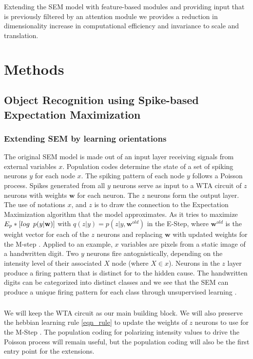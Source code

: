 \documentclass{report}
\begin{document}
Extending the SEM model with feature-based modules and providing input that is previously filtered by an attention module we provides a reduction in dimensionality increase in computational efficiency and invariance to scale and translation.

\chapter{Methods}
\section{Object Recognition using Spike-based Expectation Maximization}

\subsection{Extending SEM by learning orientations}

The original SEM model is made out of an input layer receiving signals from external variables $x$. Population codes determine the state of a set of spiking neurons $y$ for each node $x$. The spiking pattern of each node $y$ follows a Poisson process. Spikes generated from all $y$ neurons serve as input to a WTA circuit of $z$ neurons with weights $\textbf{w}$ for each neuron. The $z$ neurons form the output layer. The use of notations $x$, and $z$ is to draw the connection to the Expectation Maximization algorithm that the model approximates. As it tries to maximize $E_p*[log \hspace{5 pt} p(y|\textbf{w})]$ with $q(z|y)=p(z|y,\textbf{w}^{old})$ in the E-Step, where $\textbf{w}^{old}$ is the weight vector for each of the $z$ neurons and replacing $\textbf{w}$ with updated weights for the M-step \cite{Nessler2010, Nessler2013, Habenschuss2013}.
Applied to an example, $x$ variables are pixels from a static image of a handwritten digit. Two $y$ neurons fire antognistically, depending on the intensity level of their associated $X$ node (where $X\in x$). Neurons in the $z$ layer produce a firing pattern that is distinct for to the hidden cause. The handwritten digits can be categorized into distinct classes and we see that the SEM can produce a unique firing pattern for each class through unsupervised learning \cite{Nessler2010}. 

\paragraph{}We will keep the WTA circuit as our main building block. We will also preserve the hebbian learning rule \ref{eqn_rule} to update the weights of $z$ neurons to use for the M-Step \cite{Nessler2010}. The population coding for polarizing intensity values to drive the Poisson process will remain useful, but the population coding will also be the first entry point for the extensions.
\end{document}
